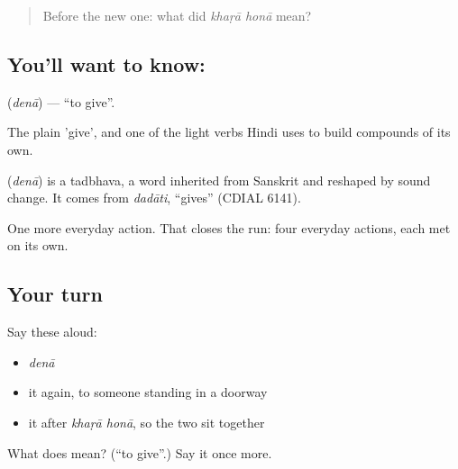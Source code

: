 \begin{quote}
Before the new one: what did \emph{khaṛā honā} mean?
\end{quote}

\subsection*{You'll want to know: }
\textbf{} (\emph{denā}) — \textquotedblleft{}to give\textquotedblright{}.

The plain 'give', and one of the light verbs Hindi uses to build compounds of its own.

\begin{cousinweb}
\textbf{} (\emph{denā}) is a tadbhava, a word inherited from Sanskrit and reshaped by sound change. It comes from \emph{dadāti}, \textquotedblleft{}gives\textquotedblright{} (CDIAL 6141).
\end{cousinweb}

\begin{grammarlens}[title={What you've built}]
One more everyday action. That closes the run: four everyday actions, each met on its own.
\end{grammarlens}

\subsection*{Your turn}
Say these aloud:

\begin{itemize}
\raggedright
  \item \emph{denā}
  \item it again, to someone standing in a doorway
  \item it after \emph{khaṛā honā}, so the two sit together
\end{itemize}

\begin{tcolorbox}[breakable,colback=teal!4,colframe=teal!35!black,title={Before you move on}]
What does  mean? (\textquotedblleft{}to give\textquotedblright{}.) Say it once more.
\end{tcolorbox}
